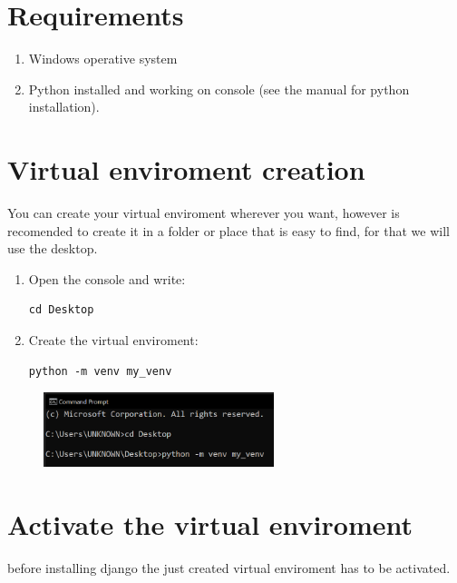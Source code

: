 \documentclass[12pt]{article}
\begin{document}
\setcounter{page}{1}%
\section{Requirements}
\begin{enumerate}
	\item Windows operative system
	\item Python installed and working on console (see the manual for python installation).
\end{enumerate}

\section{Virtual enviroment creation}
You can create your virtual enviroment wherever you want, however is recomended to create it in a folder or place 
that is easy to find, for that we will use the desktop.

	\begin{enumerate}
		\item Open the console and write: 
		
			\begin{lstlisting}[caption=\phantom{},style=conlst,label={lst:enter_desktop}]
cd Desktop
			\end{lstlisting}

		\item Create the virtual enviroment: 

			\begin{lstlisting}[caption=\phantom{},style=conlst,label={lst:create_venv}]
python -m venv my_venv
			\end{lstlisting}

	\end{enumerate}

	\begin{figure}[H]
		\centering
		\includegraphics[width=0.6\textwidth ,keepaspectratio]{imgs/venv.png}
		\caption{}
	\end{figure}

\section{Activate the virtual enviroment}
	before installing django the just created virtual enviroment has to be activated.
\end{document}
